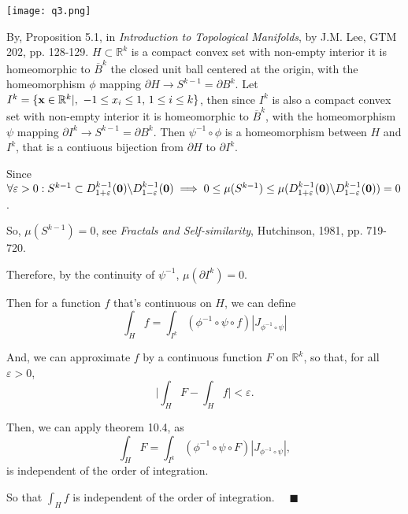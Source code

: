 \documentclass{article}
\newcommand\R{\mathbb{R}}
\begin{document}
\texttt{[image: q3.png]}


By, Proposition 5.1, in \textit{Introduction to Topological
  Manifolds}, by J.M. Lee, GTM 202, pp. 128-129.  $H\subset \R^k$ is a
compact convex set with non-empty interior it is homeomorphic to $\overline{B}^k$ the
closed unit ball centered at the origin,
with the homeomorphism $\phi$ mapping $\partial H\rightarrow S^{k-1} =
\partial B^k$. Let $I^k =\{\vb{x}\in \R^k|,\ -1 \leq x_i\leq 1,\,
1\leq i \leq k\}$, then since $I^k$ is also a compact convex set with
non-empty interior it is
homeomorphic to $\overline{B}^k$,
with the homeomorphism $\psi$ mapping $\partial I^k\rightarrow S^{k-1} =
\partial B^k$. Then $\psi^{-1}\circ \phi$ is a homeomorphism between
$H$ and $I^k$, that is a contiuous bijection from $\partial H$ to $\partial I^k$.

Since $\forall \varepsilon >0: S^{k-1} \subset
D^{k-1}_{1+\varepsilon}(\vb{0})\backslash
D^{k-1}_{1-\varepsilon}(\vb{0})\implies 0\leq \mu(S^{k-1}) \leq \mu(D^{k-1}_{1+\varepsilon}(\vb{0})\backslash
D^{k-1}_{1-\varepsilon}(\vb{0})) = 0$.

So, $\mu(S^{k-1}) = 0$, see \textit{Fractals and Self-similarity},
Hutchinson, 1981, pp. 719-720.

Therefore, by the continuity of $\psi^{-1}$, $\mu(\partial I^k) = 0.$

Then for a function $f$ that's continuous on $H$, we can define
\[\int_H f = \int_{I^k} (\phi^{-1} \circ \psi \circ f)|J_{\phi^{-1}\circ\psi}|\]

And, we can approximate $f$ by a continuous function $F$ on $\R^k$, so
that, for all $\varepsilon > 0$,
\[\bigg|\int_H F - \int_H f\bigg| < \varepsilon.\]

Then, we can apply theorem 10.4, as
\[\int_{H} F = \int_{I^k}  (\phi^{-1} \circ \psi \circ F)|J_{\phi^{-1}\circ\psi}|,\]
is independent of the order of integration.

So that $\int_H f$ is independent of the order of integration. $\quad \blacksquare$
\end{document}
